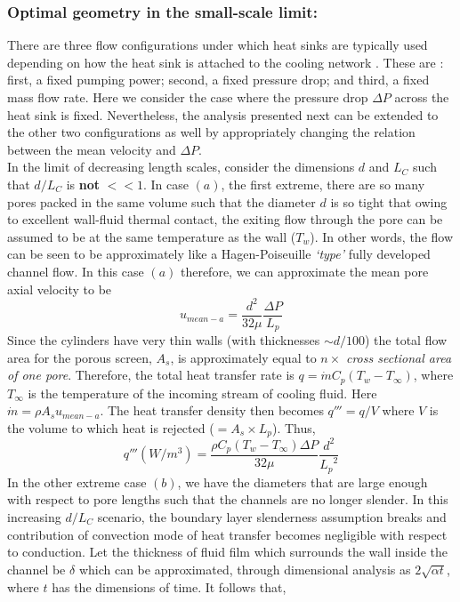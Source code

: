 \documentclass[twocolumn,10pt,cleanfoot]{ihmtc}
\begin{document}
\subsubsection*{Optimal geometry in the small-scale limit:} There are three flow configurations under which heat sinks are typically used depending on how the heat sink is attached to the cooling network \cite{types_of_cooling_configs}. These are : first, a fixed pumping power; second, a fixed pressure drop; and third, a fixed mass flow rate. Here we consider the case where the pressure drop $ \Delta P $ across the heat sink is fixed. Nevertheless, the analysis presented next can be extended to the other two configurations as well by appropriately changing the relation between the mean velocity and $\Delta P$.\\
%
In the limit of decreasing length scales, consider the dimensions $ d $ and $ L_C $ such that $d/L_C$ is \textbf{not} $<< 1$.
In case $ (a) $, the first extreme, there are so many pores packed in the same volume such that the diameter $ d $ is so tight that owing to excellent wall-fluid thermal contact, the exiting flow through the pore can be assumed to be at the same temperature as the wall ($ T_w $). In other words, the flow can be seen to be approximately like a Hagen-Poiseuille \emph{`type'} fully developed channel flow. In this case $ (a) $ therefore, we can approximate the mean pore axial velocity to be 
%
\[u_{mean-a}=\frac{{d}^{2}}{32\mu }\frac{\Delta P}{{L}_{p}}\]
%
Since the cylinders have very thin walls (with thicknesses $\sim d/100 $) the total flow area for the porous screen, $ A_s $, is approximately equal to $n \times$ {\it cross sectional area of one pore}. Therefore, the total heat transfer rate is $ q=\dot{m}C_p(T_w-T_\infty) $, where $ T_\infty $ is the temperature of the incoming stream of cooling fluid. Here $\dot{m}=\rho A_s u_{mean-a}$. The heat transfer density then becomes $ q''' =q/V$ where $ V $ is the volume to which heat is rejected ($ =A_s \times L_p$). Thus,
%
\begin{equation}\label{d0}
q'''({W}/{{m}^{3}})=\frac{\rho {{C}_{p}}(T_w-T_\infty)\Delta P}{32\mu }\frac{{{d}^{2}}}{{{L}_{p}}^{2}}
\end{equation}
%
In the other extreme case $ (b) $, we have the diameters that are large enough with respect to pore lengths such that the channels are no longer slender. In this increasing $d/L_C$ scenario, the boundary layer slenderness assumption breaks and contribution of convection mode of heat transfer becomes negligible with respect to conduction. Let the thickness of fluid film which surrounds the wall inside the channel be $ \delta $ which can be approximated, through dimensional analysis as $ 2\sqrt{\alpha t} $, where $t$ has the dimensions of time. It follows that,
\end{document}
